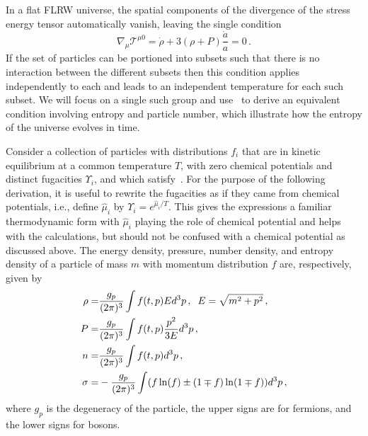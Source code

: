 In a flat FLRW universe, the spatial components of the divergence of the stress energy tensor automatically vanish, leaving the single condition
\begin{equation}\label{stress_energy_eq}
\nabla_\mu \mathcal{T}^{\mu 0}=\dot{\rho}+3\left(\rho+P\right)\frac{\dot{a}}{a}=0\,.
\end{equation}
If the set of particles can be portioned into subsets such that there is no interaction between the different subsets then this condition applies independently to each and leads to an independent temperature for each such subset. We will focus on a single such group and use~ to derive an equivalent condition involving entropy and particle number, which illustrate how the entropy of the universe evolves in time. 

Consider a collection of particles with    distributions  $f_i$ that are in kinetic equilibrium   at a common temperature $T$, with zero chemical potentials and distinct fugacities $\Upsilon_i$, and which satisfy~. For the purpose of the following derivation, it is useful to rewrite the fugacities as if they came from chemical potentials, i.e., define  $\hat{\mu}_i$ by $\Upsilon_i=e^{\hat{\mu}_i/T}$. This gives the expressions a familiar thermodynamic form with $\hat{\mu}_i$ playing the role of chemical potential and helps with the calculations, but should not be confused with a chemical potential as discussed above. The  energy density, pressure, number density, and entropy density of a particle of mass $m$ with momentum distribution $f$ are, respectively, given by
\begin{align}\label{moments}
\rho=&\frac{g_p}{(2\pi)^3}\int f(t,p)Ed^3p\,, \hspace{2mm} E=\sqrt{m^2+p^2}\,,\\
P=&\frac{g_p}{(2\pi)^3}\int f(t,p)\frac{p^2}{3E}d^3p\,,\\
n=&\frac{g_p}{(2\pi)^3}\int f(t,p) d^3p\,,\\
\sigma=&-\frac{g_p}{(2\pi)^3}\int (f\ln(f)\pm(1\mp f)\ln(1\mp f)) d^3p\,,
\end{align}
where $g_p$ is the degeneracy of the particle, the upper signs are for fermions, and the lower signs for bosons.

